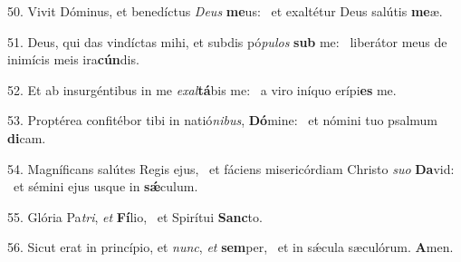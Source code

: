 50. Vivit Dóminus, et benedíctus \textit{De}\textit{us} \textbf{me}us: \ast\  et exaltétur Deus salútis \textbf{me}æ.\

51. Deus, qui das vindíctas mihi, et subdis pó\textit{pu}\textit{los} \textbf{sub} me: \ast\  liberátor meus de inimícis meis ira\textbf{cún}dis.\

52. Et ab insurgéntibus in me \textit{ex}\textit{al}\textbf{tá}bis me: \ast\  a viro iníquo erípi\textbf{es} me.\

53. Proptérea confitébor tibi in natió\textit{ni}\textit{bus}, \textbf{Dó}mine: \ast\  et nómini tuo psalmum \textbf{di}cam.\

54. Magníficans salútes Regis ejus, \dag\  et fáciens misericórdiam Christo \textit{su}\textit{o} \textbf{Da}vid: \ast\  et sémini ejus usque in \textbf{sǽ}culum.\

55. Glória Pa\textit{tri}, \textit{et} \textbf{Fí}lio, \ast\  et Spirítui \textbf{Sanc}to.\

56. Sicut erat in princípio, et \textit{nunc}, \textit{et} \textbf{sem}per, \ast\  et in sǽcula sæculórum. \textbf{A}men.\

